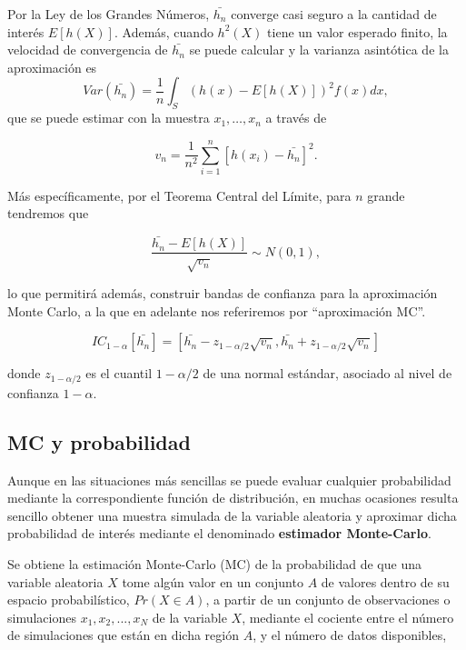 \documentclass[
]{book}
\theoremstyle{definition}
\theoremstyle{definition}
\theoremstyle{definition}
\theoremstyle{definition}
\theoremstyle{remark}
\begin{document}
Por la Ley de los Grandes Números, \(\bar{h_n}\) converge casi seguro a la cantidad de interés \(E[h(X)]\). Además, cuando \(h^2(X)\) tiene un valor esperado finito, la velocidad de convergencia de \(\bar{h_n}\) se puede calcular y la varianza asintótica de la aproximación es \[Var(\bar{h_n})=\frac{1}{n} \int_S (h(x)-E[h(X)])^2 f(x) dx,\] que se puede estimar con la muestra \(x_1,\ldots,x_n\) a través de

\begin{equation}
v_n=\frac{1}{n^2} \sum_{i=1}^n [h(x_i)-\bar{h_n}]^2.
\label{eq:varianzaMC}
\end{equation}

Más específicamente, por el Teorema Central del Límite, para \(n\) grande tendremos que

\begin{equation}
\frac{\bar{h_n}-E[h(X)]}{\sqrt{v_n}} \sim N(0,1),
\label{eq:distMC}
\end{equation}

lo que permitirá además, construir bandas de confianza para la aproximación Monte Carlo, a la que en adelante nos referiremos por ``aproximación MC''.

\begin{equation}
IC_{1-\alpha}[\bar{h_n}]=[\bar{h_n}-z_{1-\alpha/2} \sqrt{v_n}, \bar{h_n}+z_{1-\alpha/2} \sqrt{v_n}]
\label{eq:icMC}
\end{equation}

donde \(z_{1-\alpha/2}\) es el cuantil \(1-\alpha/2\) de una normal estándar, asociado al nivel de confianza \(1-\alpha\).

\hypertarget{mc-y-probabilidad}{%
\subsection{MC y probabilidad}\label{mc-y-probabilidad}}

Aunque en las situaciones más sencillas se puede evaluar cualquier probabilidad mediante la correspondiente función de distribución, en muchas ocasiones resulta sencillo obtener una muestra simulada de la variable aleatoria y aproximar dicha probabilidad de interés mediante el denominado \textbf{estimador Monte-Carlo}.

Se obtiene la estimación Monte-Carlo (MC) de la probabilidad de que una variable aleatoria \(X\) tome algún valor en un conjunto \(A\) de valores dentro de su espacio probabilístico, \(Pr(X \in A)\), a partir de un conjunto de observaciones o simulaciones \(x_1, x_2,...,x_N\) de la variable \(X\), mediante el cociente entre el número de simulaciones que están en dicha región \(A\), y el número de datos disponibles,
\end{document}
